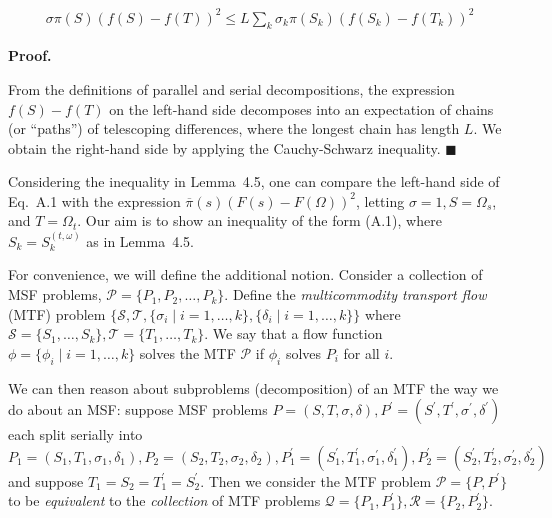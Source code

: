 \documentclass[10pt,a4paper]{article}
\begin{document}
\[\begin{gathered}
\sigma\pi(S)(f(S)-f(T))^{2}\leq L\sum_{k}\sigma_{k}\pi(S_{k})(f(S_{k})-f(T_{k}))^{2}
\end{gathered}\]






\par\medskip\noindent\textbf{Proof.}\par



From the definitions of parallel and serial decompositions, the expression $f(S)-f(T)$ on the left-hand side decomposes into an expectation of chains (or “paths”) of telescoping differences, where the longest chain has length $L$. We obtain the right-hand side by applying the Cauchy-Schwarz inequality.
\ensuremath{\blacksquare}\par





Considering the inequality in Lemma 4.5, one can compare the left-hand side of Eq. A.1 with the expression $\overline{\pi}(s)(F(s)-F(\Omega))^{2}$, letting $\sigma=1,S=\Omega_{s}$, and $T=\Omega_{t}$. Our aim is to show an inequality of the form (A.1), where $S_{k}=S_{k}^{(t,\omega)}$ as in Lemma 4.5.\par




For convenience, we will define the additional notion. Consider a collection of MSF problems, $\mathcal{P}=\{P_{1},P_{2},\dots,P_{k}\}$. Define the \emph{multicommodity transport flow} (MTF) problem $\{\mathcal{S},\mathcal{T},\{\sigma_{i}\mid i=1,\dots,k\},\{\delta_{i}\mid i=1,\dots,k\}\}$ where $\mathcal{S}=\{S_{1},\dots,S_{k}\},\mathcal{T}=\{T_{1},\dots,T_{k}\}$. We say that a flow function $\phi=\{\phi_{i}\mid i=1,\dots,k\}$ solves the MTF $\mathcal{P}$ if $\phi_{i}$ solves $P_{i}$ for all $i$.\par




We can then reason about subproblems (decomposition) of an MTF the way we do about an MSF: suppose MSF problems $P=(S,T,\sigma,\delta),P^{\prime}=(S^{\prime},T^{\prime},\sigma^{\prime},\delta^{\prime})$ each split serially into $P_{1}=(S_{1},T_{1},\sigma_{1},\delta_{1}),P_{2}=(S_{2},T_{2},\sigma_{2},\delta_{2}),P^{\prime}_{1}=(S^{\prime}_{1},T^{\prime}_{1},\sigma^{\prime}_{1},\delta^{\prime}_{1}),P^{\prime}_{2}=(S^{\prime}_{2},T^{\prime}_{2},\sigma^{\prime}_{2},\delta^{\prime}_{2})$ and suppose $T_{1}=S_{2}=T^{\prime}_{1}=S^{\prime}_{2}$. Then we consider the MTF problem $\mathcal{P}=\{P,P^{\prime}\}$ to be \emph{equivalent} to the \emph{collection} of MTF problems $\mathcal{Q}=\{P_{1},P^{\prime}_{1}\},\mathcal{R}=\{P_{2},P^{\prime}_{2}\}$.\par
\end{document}
